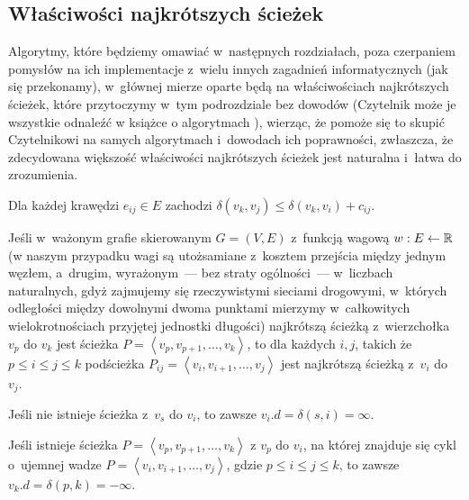 \subsection{Właściwości najkrótszych ścieżek}
\label{sub:shortestPathProperties}

Algorytmy, które będziemy omawiać w~następnych rozdziałach, poza czerpaniem pomysłów na ich implementacje z~wielu innych zagadnień informatycznych (jak się przekonamy), w~głównej mierze oparte będą na właściwościach najkrótszych ścieżek, które przytoczymy w~tym podrozdziale bez dowodów (Czytelnik może je wszystkie odnaleźć w książce o algorytmach \cite[$24.5$]{Cormen}), wierząc, że pomoże się to skupić Czytelnikowi na samych algorytmach i~dowodach ich poprawności, zwłaszcza, że zdecydowana większość właściwości najkrótszych ścieżek jest naturalna i~łatwa do zrozumienia.

\begin{lemma}\label{lem:triangleInequality}
Dla każdej krawędzi $e_{ij} \in E$ zachodzi $ \delta \left( v_{k}, v_{j} \right) \leqslant \delta \left( v_{k}, v_{i} \right) + c_{ij}$.
\end{lemma}

\begin{lemma}\label{lem:optimalSubstructure}
Jeśli w~ważonym grafie skierowanym $ G = \left( V, E \right)$ z~funkcją wagową $w: E \leftarrow \mathbb{R}$ (w naszym przypadku wagi są utożsamiane z~kosztem przejścia między jednym węzłem, a~drugim, wyrażonym~---  bez straty ogólności~---  w~liczbach naturalnych, gdyż zajmujemy się rzeczywistymi sieciami drogowymi, w~których odległości między dowolnymi dwoma punktami mierzymy w~całkowitych wielokrotnościach przyjętej jednostki długości) najkrótszą ścieżką z~wierzchołka $v_{p}$ do $v_{k}$ jest ścieżka $P = \left \langle v_{p}, v_{p+1}, \ldots, v_{k} \right \rangle $, to dla każdych $i,j$, takich że $p \leqslant i \leqslant j \leqslant k$ podścieżka $P_{ij} = \left \langle v_{i}, v_{i+1}, \ldots, v_{j} \right \rangle $ jest najkrótszą ścieżką z~$v_{i}$ do $v_{j}$.
\end{lemma}

\begin{lemma}\label{lem:noPath}
Jeśli nie istnieje ścieżka z~$v_{s}$ do $v_{i}$, to zawsze $v_{i}.d = \delta \left( s, i \right) = \infty$.
\end{lemma}

\begin{lemma}\label{lem:pathWithNegativeCycle}
Jeśli istnieje ścieżka $P = \left \langle v_{p}, v_{p+1}, \ldots, v_{k} \right \rangle $ z $v_{p}$ do $v_{i}$, na której znajduje się cykl o~ujemnej wadze $P = \left \langle v_{i}, v_{i+1}, \ldots, v_{j} \right \rangle $, gdzie $p \leqslant i \leqslant j \leqslant k$, to zawsze $v_{k}.d = \delta \left( p, k \right) = - \infty$.
\end{lemma}

